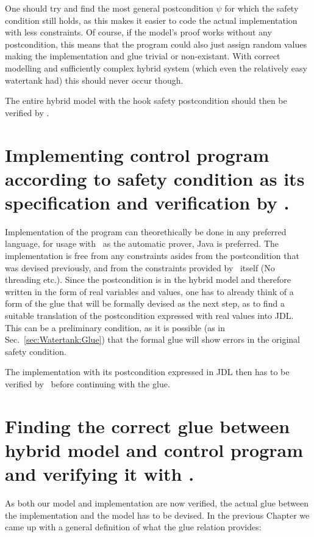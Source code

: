One should try and find the most general postcondition \(\psi\) for which the safety condition still holds, as this makes it easier to code the actual implementation with less constraints. Of course, if the model's proof works without any postcondition, this means that the program could also just assign random values making the implementation and glue trivial or non-existant. With correct modelling and sufficiently complex hybrid system (which even the relatively easy watertank had) this should never occur though.

The entire hybrid model with the hook safety postcondition should then be verified by \keym.

\section{Implementing control program according to safety condition as its specification and verification by \key.}
\label{sec:Process:Implementation}

Implementation of the program can theorethically be done in any preferred language, for usage with \key~as the automatic prover, Java is preferred. The implementation is free from any constraints asides from the postcondition that was devised previously, and from the constraints provided by \key~itself (No threading etc.). Since the postcondition is in the hybrid model and therefore written in the form of real variables and values, one has to already think of a form of the glue that will be formally devised as the next step, as to find a suitable translation of the postcondition expressed with real values into JDL. This can be a preliminary condition, as it is possible (as in Sec.~\ref{sec:Watertank:Glue}) that the formal glue will show errors in the original safety condition.

The implementation with its postcondition expressed in JDL then has to be verified by \key~before continuing with the glue. 

\section{Finding the correct glue between hybrid model and control program and verifying it with \keym.}
\label{sec:Process:Glue}

As both our model and implementation are now verified, the actual glue between the implementation and the model has to be devised. In the previous Chapter we came up with a general definition of what the glue relation provides:

